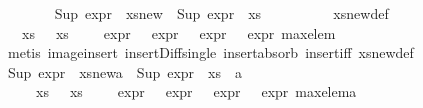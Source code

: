 \begin{isabellebody}
\ \ \ \ \ \ \isamarkupfalse%
\ {\isachardoublequoteopen}Sup\ {\isacharparenleft}{\kern0pt}expr{\isacharunderscore}{\kern0pt}{}\ {\isacharbackquote}{\kern0pt}\ xs{\isacharunderscore}{\kern0pt}new{\isacharparenright}{\kern0pt}\ {\isacharequal}{\kern0pt}\ Sup\ {\isacharparenleft}{\kern0pt}expr{\isacharunderscore}{\kern0pt}{}\ {\isacharbackquote}{\kern0pt}\ xs{\isacharparenright}{\kern0pt}{\isachardoublequoteclose}\isanewline
\ \ \ \ \ \ \ \ \isamarkupfalse%
\ xs{\isacharunderscore}{\kern0pt}new{\isacharunderscore}{\kern0pt}def\ \isanewline
\ \ \ \ \ \ \ \ \isamarkupfalse%
\ {\isacartoucheopen}{\isasymexists}{\isasymphi}\ {\isasymin}\ xs{\isachardot}{\kern0pt}\ {\isasymexists}{\isasympsi}\ {\isasymin}\ xs{\isachardot}{\kern0pt}\ {\isasymphi}\ {\isasymnoteq}\ {\isasympsi}\ {\isasymand}\ expr{\isacharunderscore}{\kern0pt}{}\ {\isasymphi}\ {\isacharequal}{\kern0pt}\ expr{\isacharunderscore}{\kern0pt}{}\ {\isasympsi}\ {\isasymand}\ expr{\isacharunderscore}{\kern0pt}{}\ {\isasympsi}\ {\isacharequal}{\kern0pt}\ expr{\isacharunderscore}{\kern0pt}{}\ max{\isacharunderscore}{\kern0pt}elem{\isacartoucheclose}\isanewline
\ \ \ \ \ \ \ \ \isamarkupfalse%
\ {\isacharparenleft}{\kern0pt}metis\ image{\isacharunderscore}{\kern0pt}insert\ insert{\isacharunderscore}{\kern0pt}Diff{\isacharunderscore}{\kern0pt}single\ insert{\isacharunderscore}{\kern0pt}absorb\ insert{\isacharunderscore}{\kern0pt}iff\ xs{\isacharunderscore}{\kern0pt}new{\isacharunderscore}{\kern0pt}def{\isacharparenright}{\kern0pt}\isanewline
\ \ \ \ \ \ \isamarkupfalse%
\ {\isachardoublequoteopen}Sup\ {\isacharparenleft}{\kern0pt}expr{\isacharunderscore}{\kern0pt}{}\ {\isacharbackquote}{\kern0pt}\ xs{\isacharunderscore}{\kern0pt}new{\isacharunderscore}{\kern0pt}a{\isacharparenright}{\kern0pt}\ {\isacharequal}{\kern0pt}\ Sup\ {\isacharparenleft}{\kern0pt}expr{\isacharunderscore}{\kern0pt}{}\ {\isacharbackquote}{\kern0pt}\ {\isacharparenleft}{\kern0pt}xs\ {\isasymunion}\ {\isacharbraceleft}{\kern0pt}a{\isacharbraceright}{\kern0pt}{\isacharparenright}{\kern0pt}{\isacharparenright}{\kern0pt}{\isachardoublequoteclose}\isanewline
\ \ \ \ \ \ \ \ \isamarkupfalse%
\ {}\ {\isachardoublequoteopen}{}{\isachardoublequoteclose}\ {\isacartoucheopen}{\isasymexists}{\isasymphi}\ {\isasymin}\ xs{\isachardot}{\kern0pt}\ {\isasymexists}{\isasympsi}\ {\isasymin}\ xs{\isachardot}{\kern0pt}\ {\isasymphi}\ {\isasymnoteq}\ {\isasympsi}\ {\isasymand}\ expr{\isacharunderscore}{\kern0pt}{}\ {\isasymphi}\ {\isacharequal}{\kern0pt}\ expr{\isacharunderscore}{\kern0pt}{}\ {\isasympsi}\ {\isasymand}\ expr{\isacharunderscore}{\kern0pt}{}\ {\isasympsi}\ {\isacharequal}{\kern0pt}\ expr{\isacharunderscore}{\kern0pt}{}\ max{\isacharunderscore}{\kern0pt}elem{\isacharunderscore}{\kern0pt}a{\isacartoucheclose}\isanewline

\end{isabellebody}

